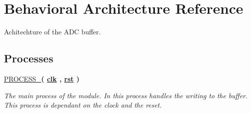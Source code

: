 \hypertarget{classADC__buffer_1_1Behavioral}{\section{Behavioral Architecture Reference}
\label{classADC__buffer_1_1Behavioral}
}


Achitechture of the A\-D\-C buffer.  


\subsection*{Processes}
 \begin{DoxyCompactItemize}
\item 
\hypertarget{classADC__buffer_1_1Behavioral_a7f0d4cc2572dde6003f96ff6890a2314}{\hyperlink{classADC__buffer_1_1Behavioral_a7f0d4cc2572dde6003f96ff6890a2314}{P\-R\-O\-C\-E\-S\-S\-\_}{\bfseries  ( {\bfseries {\bfseries \hyperlink{classADC__buffer_a8120037e0ee47c35ba2d79242209c72e}{clk}} \textcolor{vhdlchar}{ }\textcolor{vhdlchar}{ }\textcolor{vhdlchar}{ }} , {\bfseries {\bfseries \hyperlink{classADC__buffer_aa7b7040844189161771c36cf6bbf172c}{rst}} \textcolor{vhdlchar}{ }} )}}\label{classADC__buffer_1_1Behavioral_a7f0d4cc2572dde6003f96ff6890a2314}

\begin{DoxyCompactList}\small\item\em The main process of the module. In this process handles the writing to the buffer. This process is dependant on the clock and the reset. \end{DoxyCompactList}\end{DoxyCompactItemize}
